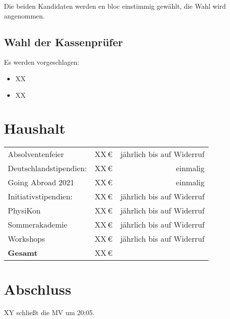 \documentclass[
  paper=a4,
  fontsize=12pt,
  parskip=half,
  headinclude=true,
]{scrartcl}
\begin{document}
Die beiden Kandidaten werden en bloc einstimmig gewählt, die Wahl wird angenommen.


\subsection{Wahl der Kassenprüfer}
Es werden vorgeschlagen:

\begin{itemize}
  \item XX
  \item XX
\end{itemize}

\section{Haushalt}


\begin{center}
\begin{tabular}{l r r}
  \toprule
  Absolventenfeier       & XX\,€ & jährlich bis auf Widerruf\\
  Deutschlandstipendien: & XX\,€ & einmalig\\
  Going Abroad 2021      & XX\,€ & einmalig\\
  Initiativstipendien:   & XX\,€ & jährlich bis auf Widerruf\\
  PhysiKon               & XX\,€ & jährlich bis auf Widerruf\\
  Sommerakademie         & XX\,€ & jährlich bis auf Widerruf\\
  Workshops              & XX\,€ & jährlich bis auf Widerruf\\
  \midrule
  \bfseries Gesamt & XX\,€ & \\
  \bottomrule
\end{tabular}
\end{center}

\section{Abschluss}

XY schließt die MV um 20:05.

\hfill
{}

\hfill
{}
\end{document}
